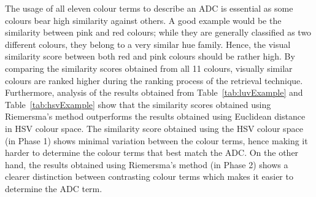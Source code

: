 The usage of all eleven colour terms to describe an ADC is essential as some colours bear high similarity against others. A good example would be the similarity between pink and red colours; while they are generally classified as two different colours, they belong to a very similar hue family. Hence, the visual similarity score between both red and pink colours should be rather high. By comparing the similarity scores obtained from all 11 colours, visually similar colours are ranked higher during the ranking process of the retrieval technique.
Furthermore, analysis of the results obtained from Table~\ref{tab:luvExample} and Table~\ref{tab:hsvExample} show that the similarity scores obtained using Riemersma's method outperforms the results obtained using Euclidean distance in HSV colour space.
The similarity score obtained using the HSV colour space (in Phase 1) shows minimal variation between the colour terms, hence making it harder to determine the colour terms that best match the ADC.
On the other hand, the results obtained using Riemersma's method (in Phase 2) shows a clearer distinction between contrasting colour terms which makes it easier to determine the ADC term.




